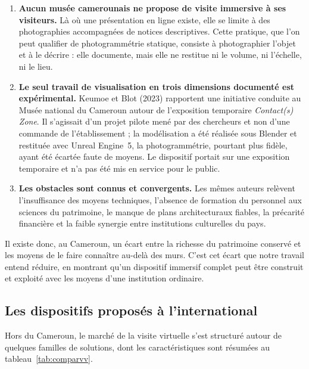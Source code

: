 \begin{enumerate}
  \item \textbf{Aucun musée camerounais ne propose de visite immersive à ses
        visiteurs.} Là où une présentation en ligne existe, elle se limite à
        des photographies accompagnées de notices descriptives. Cette pratique,
        que l'on peut qualifier de photogrammétrie statique, consiste à
        photographier l'objet et à le décrire : elle documente, mais elle ne
        restitue ni le volume, ni l'échelle, ni le lieu.

  \item \textbf{Le seul travail de visualisation en trois dimensions documenté
        est expérimental.} Keumoe et Blot (2023) rapportent une initiative
        conduite au Musée national du Cameroun autour de l'exposition
        temporaire \emph{Contact(s) Zone}. Il s'agissait d'un projet pilote mené
        par des chercheurs et non d'une commande de l'établissement ; la
        modélisation a été réalisée sous Blender et restituée avec Unreal
        Engine~5, la photogrammétrie, pourtant plus fidèle, ayant été écartée
        faute de moyens. Le dispositif portait sur une exposition temporaire et
        n'a pas été mis en service pour le public.

  \item \textbf{Les obstacles sont connus et convergents.} Les mêmes auteurs
        relèvent l'insuffisance des moyens techniques, l'absence de formation du
        personnel aux sciences du patrimoine, le manque de plans architecturaux
        fiables, la précarité financière et la faible synergie entre
        institutions culturelles du pays.
\end{enumerate}

Il existe donc, au Cameroun, un écart entre la richesse du patrimoine conservé
et les moyens de le faire connaître au-delà des murs. C'est cet écart que notre
travail entend réduire, en montrant qu'un dispositif immersif complet peut être
construit et exploité avec les moyens d'une institution ordinaire.

\subsection{Les dispositifs proposés à l'international}

Hors du Cameroun, le marché de la visite virtuelle s'est structuré autour de
quelques familles de solutions, dont les caractéristiques sont résumées au
tableau~\ref{tab:comparvv}.

